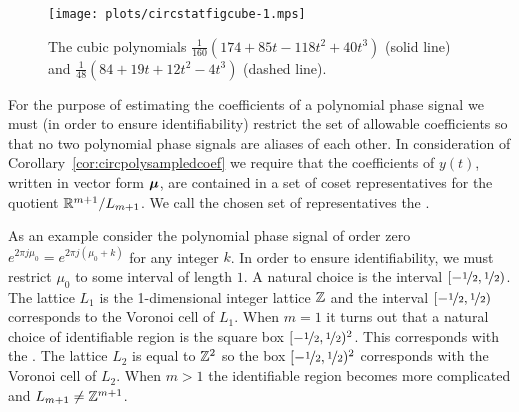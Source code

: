 \documentclass[journal]{IEEEtran}
\begin{document}

\begin{figure}[tp]
	\centering
		\texttt{[image: plots/circstatfigcube-1.mps]}
		\caption{The cubic polynomials $\tfrac{1}{160} (174 + 85 t - 118 t^2 + 40 t^3)$ (solid line) and $\tfrac{1}{48} (84 + 19 t + 12 t^2 - 4 t^3)$  (dashed line).}
		\label{fig:circstatplot_cube}
\end{figure}

For the purpose of estimating the coefficients of a polynomial phase signal we must (in order to ensure identifiability) restrict the set of allowable coefficients so that no two polynomial phase signals are aliases of each other. In consideration of Corollary~\ref{cor:circpolysampledcoef} we require that the coefficients of $y(t)$, written in vector form $\boldsymbol{\mu}$, are contained in a set of coset representatives for the quotient ${\mathbb R}^{m+1}/L_{m+1}$.  We call the chosen set of representatives the .

As an example consider the polynomial phase signal of order zero $e^{2\pi j \mu_0} = e^{2\pi j(\mu_0 + k)}$ for any integer $k$.  In order to ensure identifiability, we must restrict $\mu_0$ to some interval of length $1$.  A natural choice is the interval $[-\nicefrac{1}{2}, \nicefrac{1}{2})$. The lattice $L_1$ is the 1-dimensional integer lattice ${\mathbb Z}$ and the interval $[-\nicefrac{1}{2}, \nicefrac{1}{2})$ corresponds to the Voronoi cell of $L_1$. 
When $m=1$ it turns out that a natural choice of identifiable region is the square box $[-\nicefrac{1}{2}, \nicefrac{1}{2})^2$. This corresponds with the .  The lattice $L_2$ is equal to ${\mathbb Z}^2$ so the box $[-\nicefrac{1}{2}, \nicefrac{1}{2})^2$ corresponds with the Voronoi cell of $L_2$.  
When $m > 1$ the identifiable region becomes more complicated and $L_{m+1} \neq {\mathbb Z}^{m+1}$. %
\end{document}
